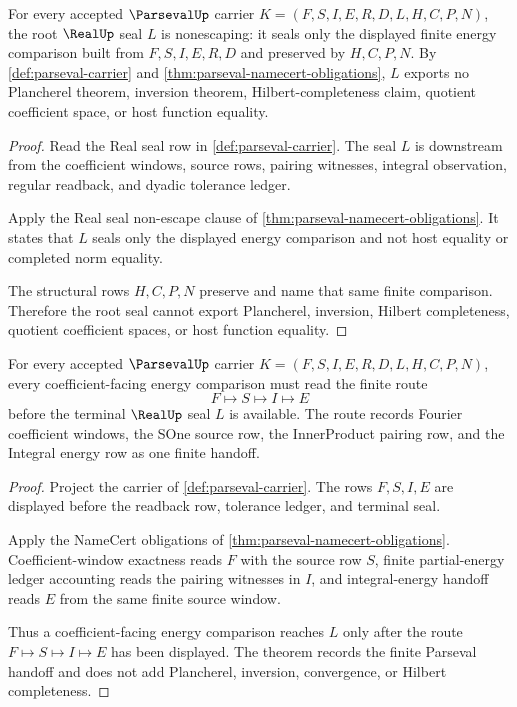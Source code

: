 \begin{theorem}
\label{thm:parseval-root-real-seal-nonescape}
For every accepted $\ParsevalUp$ carrier $K=(F,S,I,E,R,D,L,H,C,P,N)$, the root $\RealUp$ seal $L$ is nonescaping: it seals only the displayed finite energy comparison built from $F,S,I,E,R,D$ and preserved by $H,C,P,N$. By \autoref{def:parseval-carrier} and \autoref{thm:parseval-namecert-obligations}, $L$ exports no Plancherel theorem, inversion theorem, Hilbert-completeness claim, quotient coefficient space, or host function equality.
\end{theorem}
\begin{proof}
Read the Real seal row in \autoref{def:parseval-carrier}. The seal $L$ is downstream from the coefficient windows, source rows, pairing witnesses, integral observation, regular readback, and dyadic tolerance ledger.

Apply the Real seal non-escape clause of \autoref{thm:parseval-namecert-obligations}. It states that $L$ seals only the displayed energy comparison and not host equality or completed norm equality.

The structural rows $H,C,P,N$ preserve and name that same finite comparison. Therefore the root seal cannot export Plancherel, inversion, Hilbert completeness, quotient coefficient spaces, or host function equality.
\end{proof}

\begin{theorem}
\label{thm:parseval-coefficient-integral-handoff}
For every accepted $\ParsevalUp$ carrier $K=(F,S,I,E,R,D,L,H,C,P,N)$, every coefficient-facing energy comparison must read the finite route
$$
F \longmapsto S \longmapsto I \longmapsto E
$$
before the terminal $\RealUp$ seal $L$ is available. The route records Fourier coefficient windows, the SOne source row, the InnerProduct pairing row, and the Integral energy row as one finite handoff.
\end{theorem}
\begin{proof}
Project the carrier of \autoref{def:parseval-carrier}. The rows $F,S,I,E$ are displayed before the readback row, tolerance ledger, and terminal seal.

Apply the NameCert obligations of \autoref{thm:parseval-namecert-obligations}. Coefficient-window exactness reads $F$ with the source row $S$, finite partial-energy ledger accounting reads the pairing witnesses in $I$, and integral-energy handoff reads $E$ from the same finite source window.

Thus a coefficient-facing energy comparison reaches $L$ only after the route $F \longmapsto S \longmapsto I \longmapsto E$ has been displayed. The theorem records the finite Parseval handoff and does not add Plancherel, inversion, convergence, or Hilbert completeness.
\end{proof}

